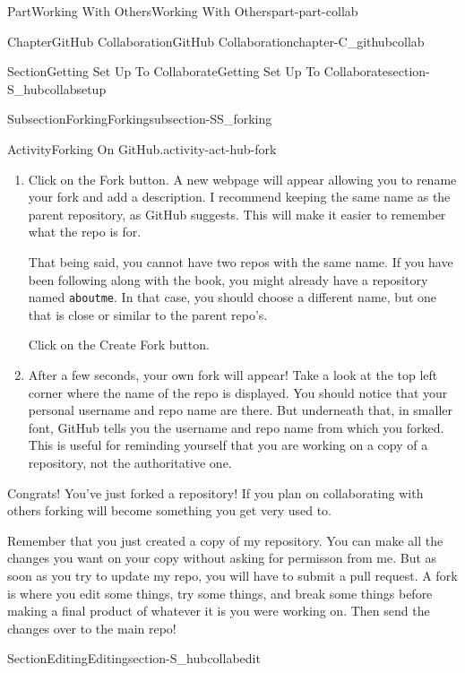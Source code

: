 \documentclass[twoside,10pt,]{book}
\newcommand{\mono}[1]{\texttt{#1}}
\begin{document}
\begin{partptx}{Part}{Working With Others}{}{Working With Others}{}{}{part-part-collab}
\begin{chapterptx}{Chapter}{GitHub Collaboration}{}{GitHub Collaboration}{}{}{chapter-C_githubcollab}
\begin{sectionptx}{Section}{Getting Set Up To Collaborate}{}{Getting Set Up To Collaborate}{}{}{section-S_hubcollabsetup}
\begin{subsectionptx}{Subsection}{Forking}{}{Forking}{}{}{subsection-SS_forking}
\begin{activity}{Activity}{Forking On GitHub.}{activity-act-hub-fork}
\begin{enumerate}[font=\bfseries,label=(\alph*),ref=\alph*]
\item{}Click on the Fork button. A new webpage will appear allowing you to rename your fork and add a description. I recommend keeping the same name as the parent repository, as GitHub suggests. This will make it easier to remember what the repo is for.%
\par
That being said, you cannot have two repos with the same name. If you have been following along with the book, you might already have a repository named \mono{aboutme}. In that case, you should choose a different name, but one that is close or similar to the parent repo's.%
\par
Click on the Create Fork button.%
\item{}After a few seconds, your own fork will appear! Take a look at the top left corner where the name of the repo is displayed. You should notice that your personal username and repo name are there. But underneath that, in smaller font, GitHub tells you the username and repo name from which you forked. This is useful for reminding yourself that you are working on a copy of a repository, not the authoritative one.%
\end{enumerate}%
\end{activity}%
%
Congrats! You've just forked a repository! If you plan on collaborating with others forking will become something you get very used to.%
\par
Remember that you just created a copy of my repository. You can make all the changes you want on your copy without asking for permisson from me. But as soon as you try to update my repo, you will have to submit a pull request. A fork is where you edit some things, try some things, and break some things before making a final product of whatever it is you were working on. Then send the changes over to the main repo!%
\end{subsectionptx}
\end{sectionptx}
%
%
\typeout{************************************************}
\typeout{************************************************}
%
\begin{sectionptx}{Section}{Editing}{}{Editing}{}{}{section-S_hubcollabedit}
%
%

\end{sectionptx}
\end{chapterptx}
\end{partptx}
\end{document}

